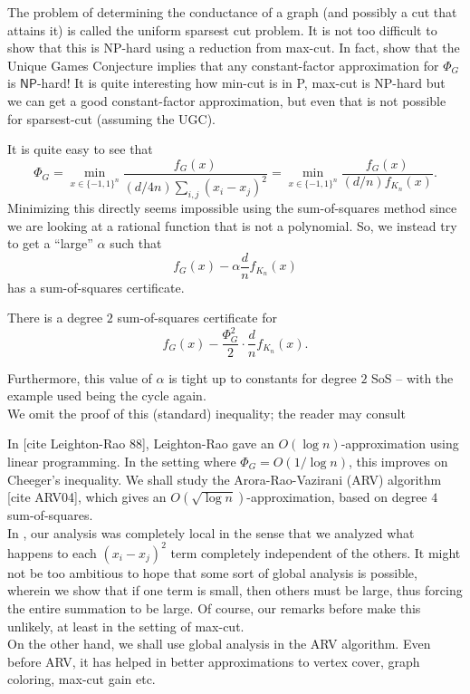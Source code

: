 	The problem of determining the conductance of a graph (and possibly a cut that attains it) is called the uniform sparsest cut problem. It is not too difficult to show that this is \textsf{NP}-hard using a reduction from max-cut. In fact, \cite{cond-appx-hard-ugc} show that the Unique Games Conjecture implies that any constant-factor approximation for $\Phi_G$ is $\mathsf{NP}$-hard! It is quite interesting how min-cut is in \textsf{P}, max-cut is \textsf{NP}-hard but we can get a good constant-factor approximation, but even that is not possible for sparsest-cut (assuming the UGC).

	It is quite easy to see that
	\[ \Phi_G = \min_{x \in \{-1,1\}^n} \frac{f_G(x)}{(d/4n) \sum_{i,j} (x_i - x_j)^2} = \min_{x \in \{-1,1\}^n} \frac{f_G(x)}{(d/n) f_{K_n}(x)}. \]
	Minimizing this directly seems impossible using the sum-of-squares method since we are looking at a rational function that is not a polynomial. So, we instead try to get a ``large'' $\alpha$ such that
	\[ f_G(x) - \alpha \frac{d}{n} f_{K_n}(x) \]
	has a sum-of-squares certificate.
	
	\begin{ftheo}
		There is a degree $2$ sum-of-squares certificate for
		\[ f_G(x) - \frac{\Phi_G^2}{2} \cdot \frac{d}{n} f_{K_n}(x). \]
	\end{ftheo}
	Furthermore, this value of $\alpha$ is tight up to constants for degree $2$ SoS -- with the example used being the cycle again.\\
	We omit the proof of this (standard) inequality; the reader may consult 

	In [cite Leighton-Rao 88], Leighton-Rao gave an $O(\log n)$-approximation using linear programming. In the setting where $\Phi_G = O(1/\log n)$, this improves on Cheeger's inequality. We shall study the Arora-Rao-Vazirani (ARV) algorithm [cite ARV04], which gives an $O(\sqrt{\log n})$-approximation, based on degree $4$ sum-of-squares. \\
	In , our analysis was completely local in the sense that we analyzed what happens to each $(x_i - x_j)^2$ term completely independent of the others. It might not be too ambitious to hope that some sort of global analysis is possible, wherein we show that if one term is small, then others must be large, thus forcing the entire summation to be large. Of course, our remarks before  make this unlikely, at least in the setting of max-cut.\\
	On the other hand, we shall use global analysis in the ARV algorithm. Even before ARV, it has helped in better approximations to vertex cover, graph coloring, max-cut gain etc.

